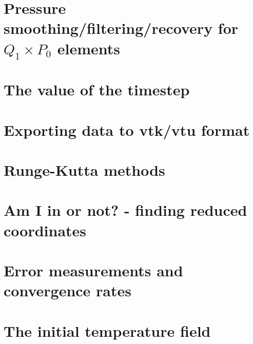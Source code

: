 \section{Pressure smoothing/filtering/recovery for $Q_1\times P_0$ elements \label{psmoothing}} 
\newpage %
\newpage %
\section{The value of the timestep}\label{ss:cfl}  %
\newpage %
\section{Exporting data to vtk/vtu format}  %
\newpage %
\section{Runge-Kutta methods}\label{ss:rkm}  %
\newpage %
\section{Am I in or not? - finding reduced coordinates}\label{sec:amiin} %
\newpage %
\section{Error measurements and convergence rates}  %
\newpage %
\section{The initial temperature field}  %
\newpage %
